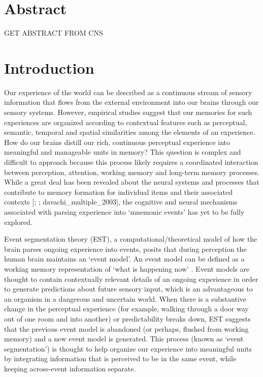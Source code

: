\section{Abstract}\label{abstract}

GET ABSTRACT FROM CNS

\section{Introduction}\label{introduction}

Our experience of the world can be described as a continuous stream of
sensory information that flows from the external environment into our
brains through our sensory systems. However, empirical studies suggest
that our memories for such experiences are organized according to
contextual features such as perceptual, semantic, temporal and spatial
similarities among the elements of an experience. How do our brains
distill our rich, continuous perceptual experience into meaningful and
manageable units in memory? This question is complex and difficult to
approach because this process likely requires a coordinated interaction
between perception, attention, working memory and long-term memory
processes. While a great deal has been revealed about the neural systems
and processes that contribute to memory formation for individual items
and their associated contexts {[}\textcite{davachi_item_2006};
\textcite{ranganath_neural_2003}; davachi\_multiple\_2003{]}, the
cognitive and neural mechanisms associated with parsing experience into
`mnemonic events' has yet to be fully explored.

Event segmentation theory (EST), a computational/theoretical model of
how the brain parses ongoing experience into events, posits that during
perception the human brain maintains an `event model'. An event model
can be defined as a working memory representation of `what is happening
now' \autocite{kurby_segmentation_2008}. Event models are thought to
contain contextually relevant details of an ongoing experience in order
to generate predictions about future sensory input, which is an
advantageous to an organism in a dangerous and uncertain world. When
there is a substantive change in the perceptual experience (for example,
walking through a door way out of one room and into another) or
predictability breaks down, EST suggests that the previous event model
is abandoned (or perhaps, flushed from working memory) and a new event
model is generated. This process (known as `event segmentation') is
thought to help organize our experience into meaningful units by
integrating information that is perceived to be in the same event, while
keeping across-event information separate.


